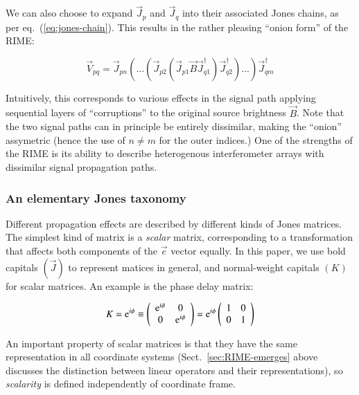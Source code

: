 \documentclass[]{aa}
\begin{document}
We can also choose to expand $\vec J_p$ and $\vec J_q$ into their associated Jones chains, as per 
eq.~(\ref{eq:jones-chain}). This results in the rather pleasing ``onion form'' of the RIME:

    \begin{equation}\label{eq:me0-onion}
    \vec V_{pq} = \vec J_{pn}(...(\vec J_{p2} (\vec J_{p1} \vec B  \vec J_{q1}^\dagger)\vec J^\dagger_{q2}) ... )\vec J^\dagger_{qm}
    \end{equation}

Intuitively, this corresponds to various effects in the signal path applying sequential layers of ``corruptions'' to the original source brightness $\vec B$. Note that the two signal paths can in principle be entirely dissimilar, making the ``onion'' assymetric (hence the use of $n\ne m$ for the outer indices.) One of the strengths of the RIME is its ability to describe heterogenous interferometer arrays with dissimilar signal propagation paths.

\subsubsection{An elementary Jones taxonomy}

Different propagation effects are described by different kinds of Jones matrices. The simplest kind of matrix is a {\em scalar} matrix, corresponding to a transformation that affects both components of the $\vec e$ vector equally. In this paper, we use bold capitals $(\vec J)$ to represent matices in general, and normal-weight capitals $(K)$ for scalar matrices. An example is the phase delay matrix:

    \[
    K = {\rm e}^{i\phi} \equiv 
    \left( 
    \begin{array}{cc}
    {\rm e}^{i\phi} & 0 \\
    0 & {\rm e}^{i\phi} \\
    \end{array}
    \right) =   
    {\rm e}^{i\phi} \left( 
    \begin{array}{cc}
    1 & 0 \\
    0 & 1 \\
    \end{array}
    \right)    
    \]

An important property of scalar matrices is that they have the same representation in all coordinate systems (Sect.~\ref{sec:RIME-emerges} above discusses the distinction between linear operators and their representations), so {\em scalarity} is defined independently of coordinate frame.
\end{document}
